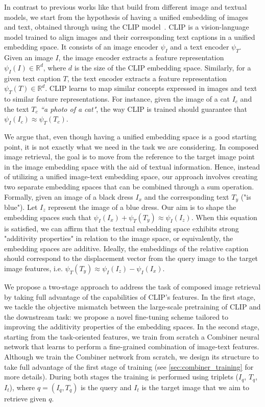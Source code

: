 \documentclass[acmlarge]{acmart}
\begin{document}
In contrast to previous works like \cite{Kim_Yu_Kim_Kim_2021, shin2021rtic, Chen_2020_CVPR, Lee_2021_CVPR} that build from different image and textual models, we start from the hypothesis of having a unified embedding of images and text, obtained through using the CLIP model~\cite{radford2021learning}.
CLIP is a vision-language model trained to align images and their corresponding text captions in a unified embedding space. It consists of an image encoder $\psi_{I}$ and a text encoder $\psi_{T}$. Given an image $I$, the image encoder extracts a feature representation $\psi_{I}(I) \in \mathbb{R}^{d}$, where $d$ is the size of the CLIP embedding space. Similarly, for a given text caption $T$, the text encoder extracts a feature representation $\psi_{T}(T) \in \mathbb{R}^{d}$. CLIP learns to map similar concepts expressed in images and text to similar feature representations.
For instance, given the image of a cat $I_c$ and the text $T_c$ \textit{``a photo of a cat"}, the way CLIP is trained should guarantee that $\psi_{I}(I_c) \approx \psi_{T}(T_c)$.

We argue that, even though having a unified embedding space is a good starting point, it is not exactly what we need in the task we are considering. 
In composed image retrieval, the goal is to move from the reference to the target image point in the image embedding space with the aid of textual information. Hence, instead of utilizing a unified image-text embedding space, our approach involves creating two separate embedding spaces that can be combined through a sum operation.
Formally, given an image of a black dress $I_x$ and the corresponding text $T_y$ ("is blue"). Let $I_z$ represent the image of a blue dress. Our aim is to shape the embedding spaces such that $\psi_{I}(I_x) + \psi_{T}(T_y) \approx \psi_{I}(I_z)$. When this equation is satisfied, we can affirm that the textual embedding space exhibits strong "additivity properties" in relation to the image space, or equivalently, the embedding spaces are additive. Ideally, the embeddings of the relative caption should correspond to the displacement vector from the query image to the target image features, i.e. $\psi_{T}(T_y) \approx \psi_{I}(I_z) - \psi_{I}(I_x)$.


We propose a two-stage approach to address the task of composed image retrieval by taking full advantage of the capabilities of CLIP's features.
In the first stage, we tackle the objective mismatch between the large-scale pretraining of CLIP and the downstream task: we propose a novel fine-tuning scheme tailored to improving the additivity properties of the embedding spaces. In the second stage, starting from the task-oriented features, we train from scratch a Combiner neural network that learns to perform a fine-grained combination of image-text features. Although we train the Combiner network from scratch, we design its structure to take full advantage of the first stage of training (see \cref{sec:combiner_training} for more details).
During both stages the training is performed using triplets ($I_q$, $T_q$, $I_t$), where $q = (I_q, T_q)$ is the query and $I_t$ is the target image that we aim to retrieve given $q$. 
\end{document}
